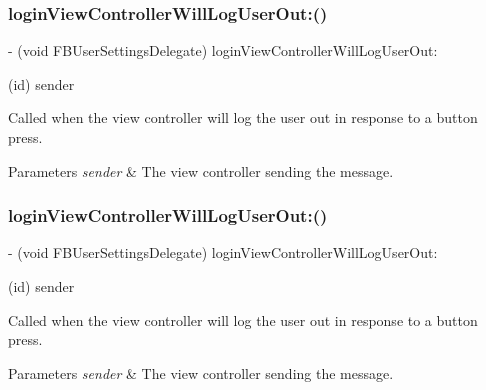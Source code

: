 \subsubsection{\texorpdfstring{login\+View\+Controller\+Will\+Log\+User\+Out\+:()}{loginViewControllerWillLogUserOut:()}\hspace{0.1cm}{\footnotesize\ttfamily [1/5]}}
{\footnotesize\ttfamily -\/ (void F\+B\+User\+Settings\+Delegate) login\+View\+Controller\+Will\+Log\+User\+Out\+: \begin{DoxyParamCaption}\item[{(id)}]{sender }\end{DoxyParamCaption}\hspace{0.3cm}{\ttfamily [optional]}}

Called when the view controller will log the user out in response to a button press.


\begin{DoxyParams}{Parameters}
{\em sender} & The view controller sending the message. \\
\hline
\end{DoxyParams}
\mbox{\label{protocolFBUserSettingsDelegate_01-p_a194e956d188265f18ec887255d90b7c8}} 
\subsubsection{\texorpdfstring{login\+View\+Controller\+Will\+Log\+User\+Out\+:()}{loginViewControllerWillLogUserOut:()}\hspace{0.1cm}{\footnotesize\ttfamily [2/5]}}
{\footnotesize\ttfamily -\/ (void F\+B\+User\+Settings\+Delegate) login\+View\+Controller\+Will\+Log\+User\+Out\+: \begin{DoxyParamCaption}\item[{(id)}]{sender }\end{DoxyParamCaption}\hspace{0.3cm}{\ttfamily [optional]}}

Called when the view controller will log the user out in response to a button press.


\begin{DoxyParams}{Parameters}
{\em sender} & The view controller sending the message. \\
\hline
\end{DoxyParams}
\mbox{\label{protocolFBUserSettingsDelegate_01-p_a194e956d188265f18ec887255d90b7c8}} 
